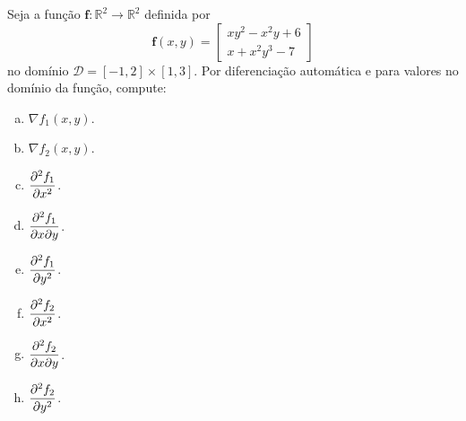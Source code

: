 \begin{exer}
  Seja a função $\pmb{f}:\mathbb{R}^2\to\mathbb{R}^2$ definida por
  \begin{equation}
    \pmb{f}(x,y) =
    \begin{bmatrix}
      xy^2 - x^2y + 6\\
      x + x^2y^3 - 7
    \end{bmatrix}
  \end{equation}
  no domínio $\mathcal{D} = [-1, 2]\times [1, 3]$.
  Por diferenciação automática e para valores no domínio da função, compute:
  \begin{enumerate}[a)]
  \item $\displaystyle\nabla f_1(x,y)$.
  \item $\displaystyle\nabla f_2(x,y)$.
  \item $\displaystyle\frac{\partial^2 f_1}{\partial x^2}$.
  \item $\displaystyle\frac{\partial^2 f_1}{\partial x\partial y}$.
  \item $\displaystyle\frac{\partial^2 f_1}{\partial y^2}$.
  \item $\displaystyle\frac{\partial^2 f_2}{\partial x^2}$.
  \item $\displaystyle\frac{\partial^2 f_2}{\partial x\partial y}$.
  \item $\displaystyle\frac{\partial^2 f_2}{\partial y^2}$.
  \end{enumerate}
\end{exer}
